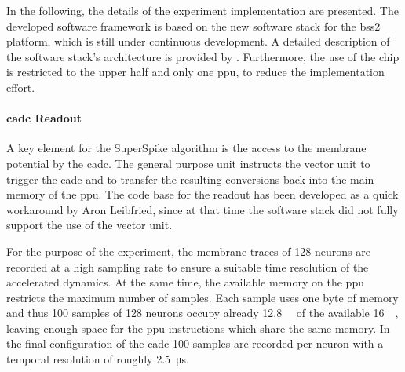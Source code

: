 In the following, the details of the experiment implementation are presented. The developed software framework is based on the new software stack for the \gls{bss2} platform, which is still under continuous development. A detailed description of the software stack's architecture is provided by \cite{mueller2020bss2ll}. Furthermore, the use of the chip is restricted to the upper half and only one \gls{ppu}, to reduce the implementation effort.

\paragraph{\gls{cadc} Readout}
A key element for the SuperSpike algorithm is the access to the membrane potential by the \gls{cadc}. The general purpose unit instructs the vector unit to trigger the \gls{cadc} and to transfer the resulting conversions back into the main memory of the \gls{ppu}. The code base for the readout has been developed as a quick workaround by Aron Leibfried, since at that time the software stack did not fully support the use of the vector unit.

For the purpose of the experiment, the membrane traces of 128 neurons are recorded at a high sampling rate to ensure a suitable time resolution of the accelerated dynamics. At the same time, the available memory on the \gls{ppu} restricts the maximum number of samples. Each sample uses one byte of memory and thus 100 samples of 128 neurons occupy already \SI{12.8}{\kilo \byte} of the available \SI{16}{\kilo \byte}, leaving enough space for the \gls{ppu} instructions which share the same memory. In the final configuration of the \gls{cadc} 100 samples are recorded per neuron with a temporal resolution of roughly \SI{2.5}{\micro \s}.

